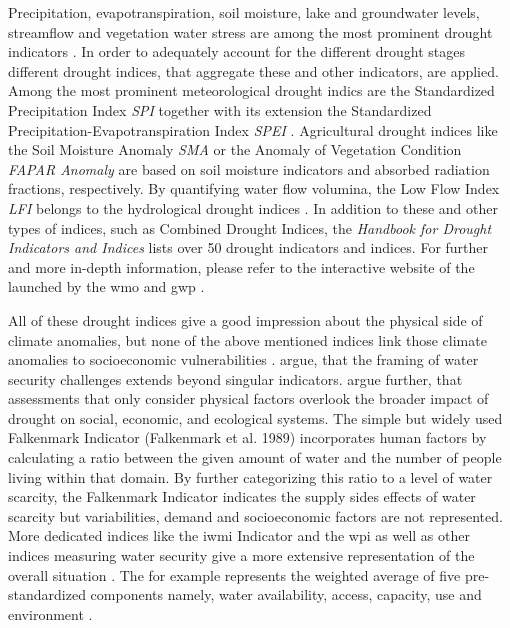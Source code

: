 {%
Precipitation, evapotranspiration, soil moisture, lake and groundwater levels, streamflow and vegetation water stress are among the most prominent drought indicators \autocite{europeandroughtobservatoryDroughtIndicators2017}. In order to adequately account for the different drought stages different drought indices, that aggregate these and other indicators, are applied. Among the most prominent meteorological drought indics are the Standardized Precipitation Index \textit{SPI} together with its extension the Standardized Precipitation-Evapotranspiration Index \textit{SPEI} \autocite{europeandroughtobservatoryDroughtIndicators2017,ncarStandardizedPrecipitationEvapotranspiration,ncarStandardizedPrecipitationIndex}. Agricultural drought indices like the Soil Moisture Anomaly \textit{SMA} or the Anomaly of Vegetation Condition \textit{FAPAR Anomaly} are based on soil moisture indicators and absorbed radiation fractions, respectively. By quantifying water flow volumina, the Low Flow Index \textit{LFI} belongs to the hydrological drought indices \autocite{europeandroughtobservatoryDroughtIndicators2017, svobodaHandbookDroughtIndicators2016}. In addition to these and other types of indices, such as Combined Drought Indices, the \textit{Handbook for Drought Indicators and Indices} lists over 50 drought indicators and indices. For further and more in-depth information, please refer to the interactive website of the  launched by the \acrfull{wmo} and \acrfull*{gwp} \autocite{idmpIndicatorsIndicesIntegrated2021}. 

All of these drought indices give a good impression about the physical side of climate anomalies, but none of the above mentioned indices link those climate anomalies to socioeconomic vulnerabilities \autocite{enenkelWhyPredictClimate2020}. \autocite{mishraWaterSecurityChanging2021} argue, that the framing of water security challenges extends beyond singular indicators. \autocite{lackstromBackyardHydroclimatologyCitizen2022} argue further, that assessments that only consider physical factors overlook the broader impact of drought on social, economic, and ecological systems.
The simple but widely used Falkenmark Indicator (Falkenmark et al. 1989) incorporates human factors by calculating a ratio between the given amount of water and the number of people living within that domain. By further categorizing this ratio to a level of water scarcity, the Falkenmark Indicator indicates the supply sides effects of water scarcity but variabilities, demand and socioeconomic factors are not represented. More dedicated indices like the \acrfull*{iwmi} Indicator and the \acrfull*{wpi} as well as other indices measuring water security give a more extensive representation of the overall situation \autocite{arreguin-cortesMunicipalLevelWater2019,liuWaterScarcityAssessments2017}. The  for example represents the weighted average of five pre-standardized components namely, water availability, access, capacity, use and environment \autocite{sullivanWaterPovertyIndex2003}.

}
